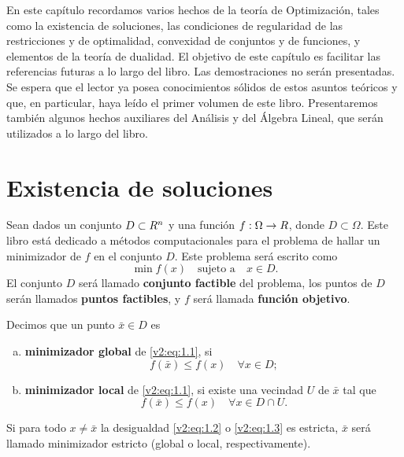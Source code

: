 
En este capítulo recordamos varios hechos de la teoría de Optimización, tales como la existencia de soluciones, las condiciones de regularidad de las restricciones y de optimalidad, convexidad de conjuntos y de funciones, y elementos de la teoría de dualidad. El objetivo de este capítulo es facilitar las referencias futuras a lo largo del libro.
Las demostraciones no serán presentadas. Se espera que el lector ya posea conocimientos sólidos de estos asuntos teóricos y que, en particular, haya leído el primer volumen \cite{izmailov2020otimizacaovolume1} de este libro. Presentaremos también algunos hechos auxiliares del Análisis y del Álgebra Lineal, que serán utilizados a lo largo del libro.

\section{Existencia de soluciones}

Sean dados un conjunto $D \subset R^n$ y una función $f : \Omega \to R$, donde $D \subset \Omega$. Este libro está dedicado a métodos computacionales para el problema de hallar un minimizador de $f$ en el conjunto $D$. Este problema será escrito como
\begin{equation}
    \min f(x) \quad \text{sujeto a} \quad x \in D.
    \label{v2:eq:1.1}
\end{equation}
El conjunto $D$ será llamado \textbf{conjunto factible} del problema, los puntos de $D$ serán llamados \textbf{puntos factibles}, y $f$ será llamada \textbf{función objetivo}.

\begin{definition}\label{v2:def:1.1.1}
    Decimos que un punto $\bar{x} \in D$ es
    \begin{enumerate}[(a)]
        \item \textbf{minimizador global} de \eqref{v2:eq:1.1}, si
        \begin{equation}
            f(\bar{x}) \le f(x) \quad \forall x \in D;
            \label{v2:eq:1.2}
        \end{equation}
        \item \textbf{minimizador local} de \eqref{v2:eq:1.1}, si existe una vecindad $U$ de $\bar{x}$ tal que
        \begin{equation}
            f(\bar{x}) \le f(x) \quad \forall x \in D \cap U.
            \label{v2:eq:1.3}
        \end{equation}
    \end{enumerate}
    Si para todo $x \neq \bar{x}$ la desigualdad \eqref{v2:eq:1.2} o \eqref{v2:eq:1.3} es estricta, $\bar{x}$ será llamado minimizador estricto (global o local, respectivamente).
\end{definition}

